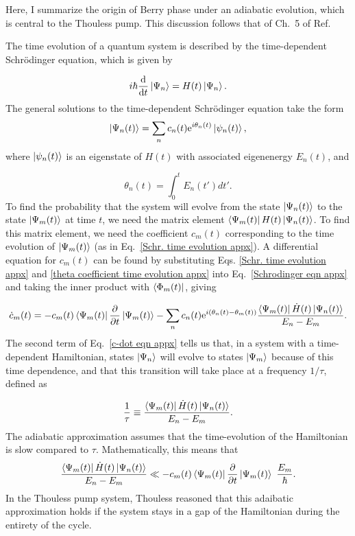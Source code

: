 \documentclass[double,12pt,1in,seploa]{beavtex}
\begin{document}
Here, I summarize the origin of Berry phase under an adiabatic evolution, which is central to the Thouless pump. This discussion follows that of Ch.\ 5 of Ref.\ \cite{sakurai_modern_1985}

The time evolution of a quantum system is described by the time-dependent Schrödinger equation, which is given by

\begin{equation}
    i \hbar \derivative{t}\ket{\Psi_n} = H(t)\ket{\Psi_n}. \label{Schrodinger eqn appx}
\end{equation}
The general solutions to the time-dependent Schrödinger equation take the form
\begin{equation}
    \ket{\Psi_n(t)} = \sum_n c_n(t) \mathrm{e}^{i \theta_n(t)} \ket{\psi_n(t)}, \label{Schr. time evolution appx}
\end{equation}
where $\ket{\psi_n(t)}$ is an eigenstate of $H(t)$ with associated eigenenergy $E_n(t)$, and 

\begin{equation}
    \theta_n(t) = \int_{0}^{t}E_n(t')dt'. \label{theta coefficient time evolution appx}
\end{equation}
To find the probability that the system will evolve from the state $\ket{\Psi_n(t)}$ to the state $\ket{\Psi_m(t)}$ at time $t$, we need the matrix element $\bra{\Psi_m(t)}H(t)\ket{\Psi_n(t)}$. To find this matrix element, we need the coefficient $c_m(t)$ corresponding to the time evolution of $\ket{\Psi_m(t)}$ (as in Eq.\ \ref{Schr. time evolution appx}). A differential equation for $c_m(t)$ can be found by substituting Eqs. \ref{Schr. time evolution appx} and \ref{theta coefficient time evolution appx} into Eq.\ \ref{Schrodinger eqn appx} and taking the inner product with $\bra{\Phi_m(t)}$, giving \cite[p.\ 347]{sakurai_modern_1985}

\begin{equation}
    \dot{c}_m(t) = - c_m(t) \bra{\Psi_m(t)}\pdv{t}\ket{\Psi_m(t)} - \sum_n c_n(t) \mathrm{e}^{i (\theta_n(t) - \theta_m(t))} \frac{\bra{\Psi_m(t)}\dot{H}(t)\ket{\Psi_n(t)}}{E_n - E_m}. \label{c-dot eqn appx}
\end{equation}
The second term of Eq.\ \ref{c-dot eqn appx} tells us that, in a system with a time-dependent Hamiltonian, states $\ket{\Psi_n}$ will evolve to states $\ket{\Psi_m}$ because of this time dependence, and that this transition will take place at a frequency $1/\tau$, defined as 

\begin{equation}
    \frac{1}{\tau} \equiv \frac{\bra{\Psi_m(t)}\dot{H}(t)\ket{\Psi_n(t)}}{E_n - E_m}.
\end{equation}
The adiabatic approximation assumes that the time-evolution of the Hamiltonian is slow compared to $\tau$. Mathematically, this means that
\begin{equation}
    \frac{\bra{\Psi_m(t)}\dot{H}(t)\ket{\Psi_n(t)}}{E_n - E_m} \ll - c_m(t) \bra{\Psi_m(t)}\pdv{t}\ket{\Psi_m(t)} ~ \frac{E_m}{\hbar}. \label{adiabatic approximation condition appx}
\end{equation}
In the Thouless pump system, Thouless reasoned that this adaibatic approximation holds if the system stays in a gap of the Hamiltonian during the entirety of the cycle.
\end{document}
